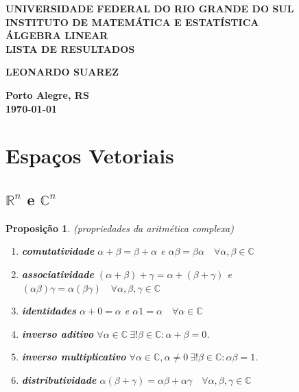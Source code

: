\documentclass[12pt]{article}
\theoremstyle{plain}
\newtheorem{prop}[thm]{Proposição}
\theoremstyle{definition}
\theoremstyle{remark}
\begin{document}
\begin{center}
    \textbf{\large UNIVERSIDADE FEDERAL DO RIO GRANDE DO SUL} \\
    \textbf{\large INSTITUTO DE MATEMÁTICA E ESTATÍSTICA} \\
    \vspace{3cm}
    \textbf{\Large ÁLGEBRA LINEAR} \\
    \vspace{1cm}
    \textbf{\large LISTA DE RESULTADOS} \\
    \vspace{3cm}

    \textbf{LEONARDO SUAREZ}

    \vfill
    \textbf{\large Porto Alegre, RS} \\
    \textbf{\large \today}
\end{center}

\newpage
\tableofcontents
\newpage

\section{Espaços Vetoriais}

\subsection{\(\mathbb{R}^n\) e \(\mathbb{C}^n\)}
\begin{prop} (propriedades da aritmética complexa)
    \begin{enumerate}
        \item[\textup{(a)}] \textup{\textbf{comutatividade}} \(\alpha + \beta = \beta + \alpha\) e \(\alpha \beta = \beta \alpha \quad \forall \alpha, \beta \in \mathbb{C}\)
        \item[\textup{(b)}] \textup{\textbf{associatividade}} \((\alpha + \beta) + \gamma = \alpha + (\beta + \gamma)\) e \((\alpha \beta) \gamma = \alpha (\beta \gamma) \quad \forall \alpha, \beta, \gamma \in \mathbb{C}\)
        \item[\textup{(c)}] \textup{\textbf{identidades}} \(\alpha + 0 = \alpha\) e \(\alpha 1 = \alpha \quad \forall \alpha \in \mathbb{C}\)
        \item[\textup{(d)}] \textup{\textbf{inverso aditivo}} \(\forall \alpha \in \mathbb{C}\ \exists!\beta \in \mathbb{C}: \alpha + \beta = 0\).
        \item[\textup{(e)}] \textup{\textbf{inverso multiplicativo}} \(\forall \alpha \in \mathbb{C}, \alpha \neq 0\ \exists! \beta \in \mathbb{C}: \alpha \beta = 1\).
        \item[\textup{(f)}] \textup{\textbf{distributividade}} \(\alpha(\beta + \gamma) = \alpha \beta + \alpha \gamma \quad \forall \alpha, \beta, \gamma \in \mathbb{C}\)
    \end{enumerate}
\end{prop}
\end{document}
